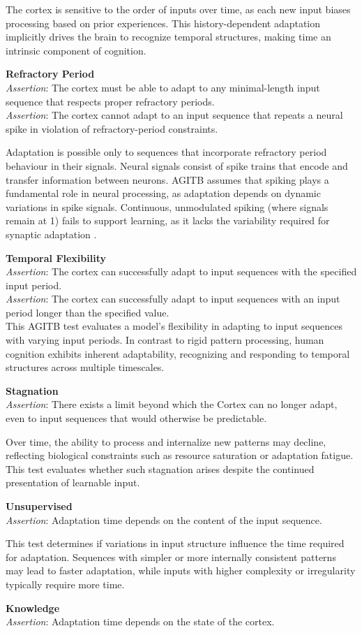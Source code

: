 \documentclass{article}
\newcommand{\agitbtest}[2]{
 \item \textbf{#1} \\
 #2
}
\begin{document}
\begin{agitblist}
{The cortex is sensitive to the order of inputs over time, as each new input biases processing based on prior experiences. This history-dependent adaptation implicitly drives the brain to recognize temporal structures, making time an intrinsic component of cognition.
}
\agitbtest{Refractory Period}{
\emph{Assertion}: The cortex must be able to adapt to any minimal-length input sequence that respects proper refractory periods.\\
\emph{Assertion}: The cortex cannot adapt to an input sequence that repeats a neural spike in violation of refractory-period constraints.

Adaptation is possible only to sequences that incorporate refractory period behaviour in their signals. Neural signals consist of spike trains that encode and transfer information between neurons. AGITB assumes that spiking plays a fundamental role in neural processing, as adaptation depends on dynamic variations in spike signals. Continuous, unmodulated spiking (where signals remain at 1) fails to support learning, as it lacks the variability required for synaptic adaptation \cite{Gerstner2002}. 
}
\agitbtest{Temporal Flexibility}{
\emph{Assertion}:  The cortex can successfully adapt to input sequences with the specified input period.\\
\emph{Assertion}: The cortex can successfully adapt to input sequences with an input period longer than the specified value.\\

This AGITB test evaluates a model’s flexibility in adapting to input sequences with varying input periods. In contrast to rigid pattern processing, human cognition exhibits inherent adaptability, recognizing and responding to temporal structures across multiple timescales.
}
\agitbtest{Stagnation}{
\emph{Assertion}: There exists a limit beyond which the Cortex can no longer adapt, even to input sequences that would otherwise be predictable.

Over time, the ability to process and internalize new patterns may decline, reflecting biological constraints such as resource saturation or adaptation fatigue. This test evaluates whether such stagnation arises despite the continued presentation of learnable input.
}
\agitbtest{Unsupervised}{
\emph{Assertion}: Adaptation time depends on the content of the input sequence.

This test determines if variations in input structure influence the time required for adaptation. Sequences with simpler or more internally consistent patterns may lead to faster adaptation, while inputs with higher complexity or irregularity typically require more time. 
}
\agitbtest{Knowledge}{
\emph{Assertion}: Adaptation time depends on the state of the cortex.

}
\end{agitblist}
\end{document}
